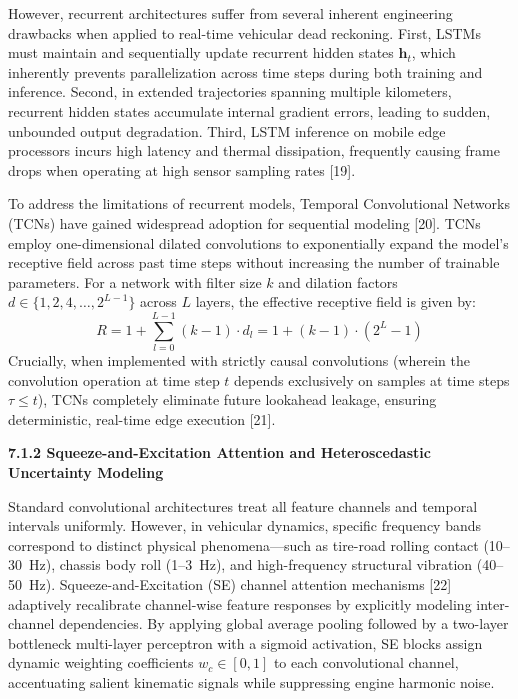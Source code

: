\documentclass[11pt,a4paper]{article}
\begin{document}
However, recurrent architectures suffer from several inherent engineering drawbacks when applied to real-time vehicular dead reckoning. First, LSTMs must maintain and sequentially update recurrent hidden states $\mathbf{h}_t$, which inherently prevents parallelization across time steps during both training and inference. Second, in extended trajectories spanning multiple kilometers, recurrent hidden states accumulate internal gradient errors, leading to sudden, unbounded output degradation. Third, LSTM inference on mobile edge processors incurs high latency and thermal dissipation, frequently causing frame drops when operating at high sensor sampling rates [19].

To address the limitations of recurrent models, Temporal Convolutional Networks (TCNs) have gained widespread adoption for sequential modeling [20]. TCNs employ one-dimensional dilated convolutions to exponentially expand the model's receptive field across past time steps without increasing the number of trainable parameters. For a network with filter size $k$ and dilation factors $d \in \{1, 2, 4, \dots, 2^{L-1}\}$ across $L$ layers, the effective receptive field is given by:
\begin{equation}
R = 1 + \sum_{l=0}^{L-1} (k - 1) \cdot d_l = 1 + (k - 1) \cdot (2^L - 1)
\end{equation}
Crucially, when implemented with strictly causal convolutions (wherein the convolution operation at time step $t$ depends exclusively on samples at time steps $\tau \le t$), TCNs completely eliminate future lookahead leakage, ensuring deterministic, real-time edge execution [21].

\textbf{7.1.2 Squeeze-and-Excitation Attention and Heteroscedastic Uncertainty Modeling}

Standard convolutional architectures treat all feature channels and temporal intervals uniformly. However, in vehicular dynamics, specific frequency bands correspond to distinct physical phenomena—such as tire-road rolling contact (10–30~Hz), chassis body roll (1–3~Hz), and high-frequency structural vibration (40–50~Hz). Squeeze-and-Excitation (SE) channel attention mechanisms [22] adaptively recalibrate channel-wise feature responses by explicitly modeling inter-channel dependencies. By applying global average pooling followed by a two-layer bottleneck multi-layer perceptron with a sigmoid activation, SE blocks assign dynamic weighting coefficients $w_c \in [0, 1]$ to each convolutional channel, accentuating salient kinematic signals while suppressing engine harmonic noise.
\end{document}
